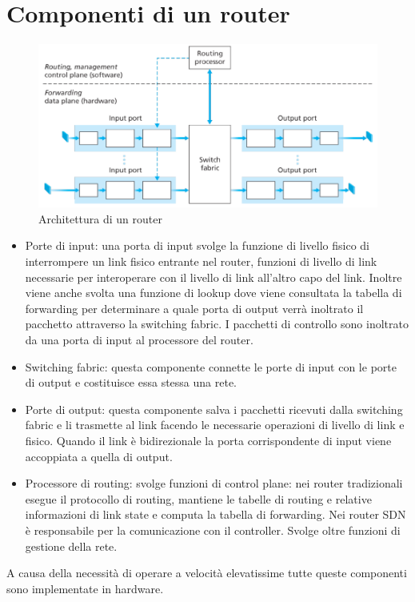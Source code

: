 \section{Componenti di un router}
\begin{figure}[h]
\includegraphics[width=\textwidth]{Router.png}
\caption{Architettura di un router}
\end{figure}
\begin{itemize}
\item Porte di input: una porta di input svolge la funzione di livello fisico di interrompere un link fisico entrante nel router, funzioni di livello di 
link necessarie per interoperare con il livello di link all'altro capo del link. Inoltre viene anche svolta una funzione di lookup dove viene consultata la 
tabella di forwarding per determinare a quale porta di output verr\`a inoltrato il pacchetto attraverso la switching fabric. I pacchetti di controllo sono
inoltrato da una porta di input al processore del router.
\item Switching fabric: questa componente connette le porte di input con le porte di output e costituisce essa stessa una rete. 
\item Porte di output: questa componente salva i pacchetti ricevuti dalla switching fabric e li trasmette al link facendo le necessarie operazioni 
di livello di link e fisico. Quando il link \`e bidirezionale la porta corrispondente di input viene accoppiata a quella di output. 
\item Processore di routing: svolge funzioni di control plane: nei router tradizionali esegue il protocollo di routing, mantiene le tabelle di routing e 
relative informazioni di link state e computa la tabella di forwarding. Nei router SDN \`e responsabile per la comunicazione con il controller. Svolge oltre
funzioni di gestione della rete.
\end{itemize}
A causa della necessit\`a di operare a velocit\`a elevatissime tutte queste componenti sono implementate in hardware.
